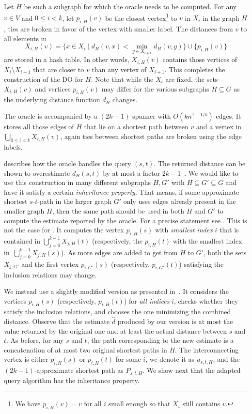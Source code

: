 \documentclass{article}\usepackage[a4paper,margin=20mm]{geometry}
\renewcommand{\le}{\leqslant}
\begin{document}
Let $H$ be such a subgraph for which the oracle needs to be computed.
For any $v\in V$ and $0\le i<k$, 
let $p_{i,H}(v)$ be the closest vertex\footnote{%
  We have $p_{i,H}(v) = v$  for all $i$ small enough so that $X_{i}$ still contains $v$.
}
to $v$ in $X_i$ in the graph $H$,
ties are broken in favor of the vertex with smaller label.
The distances from $v$ to all elements in
\begin{equation*}
	X_{i,H}(v)=\{x\in X_i \mid d_H(v,x) < \min_{y\in X_{i+1}}d_H(v,y)\} \cup \{p_{i,H}(v)\}
\end{equation*}
are stored in a hash table.
In other words, $X_{i,H}(v)$ contains those vertices of $X_i{\setminus}X_{i+1}$ that are closer to $v$
than any vertex of $X_{i+1}$.
This completes the construction of the DO for $H$.
Note that while the $X_i$ are fixed,
the sets $X_{i,H}(v)$ and vertices $p_{i,H}(v)$ may differ for the various subgraphs $H \subseteq G$
as the underlying distance function $d_H$ changes.

The oracle is accompanied by a $(2k{-}1)$-spanner with $O(k n^{1+1/k})$ edges.
It stores all those edges of $H$ that lie on
a shortest path between $v$ and a vertex in $\bigcup_{0\le i<k}X_{i,H}(v)$,
again ties between shortest paths are broken using the edge labels. 


 describes how the oracle handles the query $(s,t)$.
The returned distance can be shown to overestimate $d_H(s,t)$ by at most a factor $2k{-}1$~\cite[Lemma~3.3]{ThorupZ05}.
We would like to use this construction in many different subgraphs $H,G'$
with $H \subseteq G' \subseteq G$
and have it satisfy a certain \emph{inheritance property}.
That means, if some approximate shortest $s$-$t$-path in the larger graph $G'$
only uses edges already present in the smaller graph $H$,
then the same path should be used in both $H$ and $G'$ 
to compute the estimate reported by the oracle.
For a precise statement see .
This is not the case for .
It computes the vertex $p_{i,H}(s)$ with \emph{smallest index} $i$
that is contained in $\bigcup_{j=0}^{k-1} X_{j,H}(t)$
(respectively, the $p_{i,H}(t)$ with the smallest index in~$\bigcup_{j=0}^{k-1} X_{j,H}(s)$).
As more edges are added to get from $H$ to $G'$,
both the sets $X_{j,G'}$ and the first vertex $p_{i,G'}(s)$ (respectively, $p_{i,G'}(t)$) 
satisfying the inclusion relations may change.

We instead use a slightly modified version as presented in~. 
It considers the vertices $p_{i,H}(s)$ (respectively, $p_{i,H}(t)$) for \emph{all indices} $i$,
checks whether they satisfy the inclusion relations,
and chooses the one minimizing the combined distance.
Observe that the estimate $\widehat{d}$ produced by our version is at most the value returned 
by the original one and at least the actual distance between $s$ and $t$.
As before, for any $s$ and $t$, 
the path corresponding to the new estimate is a concatenation of 
at most two original shortest paths in $H$.
The interconnecting vertex is either $p_{i,H}(s)$ or $p_{i,H}(t)$ for some $i$,
we denote it as $u_{s,t,H}$, and the $(2k{-}1)$-approximate
shortest path as $P_{s,t,H}$.
We show next that the adapted query algorithm has the inheritance property.
\end{document}
